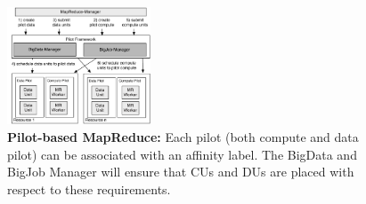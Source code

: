 \documentclass[12pt]{report}
\newcommand{\upp}{\vspace*{-0.5em}}
\begin{document}
\begin{figure}[t]
	\centering
	\includegraphics[width=0.38\textwidth]{figures/mapreduce-pilotdata.pdf}
	\caption{\textbf{Pilot-based MapReduce:} Each pilot (both compute and data 
	pilot) can be associated with an affinity label. The BigData and BigJob 
	Manager will ensure that CUs and DUs are placed with respect to these 
	requirements.\upp}
	\label{fig:figures_mapreduce-pilotdata}
\end{figure}
\end{document}
